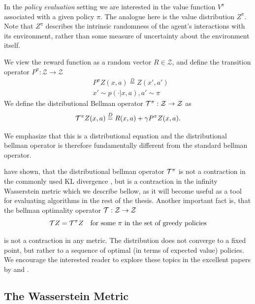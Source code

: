In the \emph{policy evaluation} setting \citep{sutton1998reinforcement} we are interested in the value function $V^\pi$ associated with a given policy $\pi$. The analogue here is the value distribution $Z^\pi$. Note that $Z^\pi$ describes the intrinsic randomness of the agent's interactions with its environment, rather than some measure of uncertainty about the environment itself.
%

We view the reward function as a random vector $R \in \mathcal{Z}$, and define the transition operator $P^\pi : \mathcal{Z} \to \mathcal{Z}$
\begin{equation}
\begin{split}
&P^\pi Z(x, a) \overset{D}{=} Z(x', a')\\
&x' \sim p(\cdot|x, a), a' \sim \pi
\end{split}
\end{equation}
We define the distributional Bellman operator $\mathcal{T}^\pi : \mathcal{Z} \to \mathcal{Z}$ as
\begin{equation}
\mathcal{T}^\pi Z(x,a) \overset{D}{=} R(x,a) + \gamma P^\pi Z(x,a).
\end{equation}

We emphasize that this is a distributional equation and the distributional bellman operator is therefore fundamentally different from the standard bellman operator.

\citet{bellemare2017distributional} have shown, that the distributional bellman operator $\mathcal{T}^\pi$ is not a contraction in the commonly used KL divergence \cite{kullback1997information}, but is a contraction in the infinity Wasserstein metric which we describe bellow, as it will become useful as a tool for evaluating algorithms in the rest of the thesis. Another important fact is, that the bellman optimality operator $\mathcal{T} : \mathcal{Z}\to\mathcal{Z}$
\begin{equation}
\mathcal{T} Z = \mathcal{T}^\pi Z \quad \text{for some } \pi \text{ in the set of greedy policies}
\end{equation}

is not a contraction in any metric. The distribution does not converge to a fixed point, but rather to a sequence of optimal (in terms of expected value) policies. We encourage the interested reader to explore these topics in the excellent papers by \citet{bellemare2017distributional} and \citet{dabney2017distributional}.

\subsection{The Wasserstein Metric}
\newcommand{\pnorm}[1]{\| #1 \|_p}

